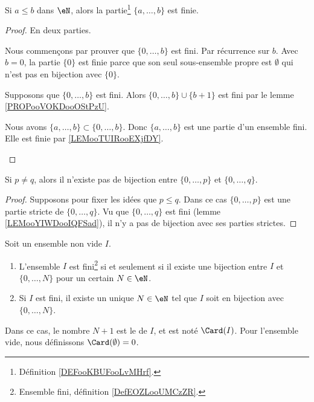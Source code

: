 \begin{lemma}       \label{LEMooYIWDooIQFSad}
	Si \( a\leq b\) dans \( \eN\), alors la partie\footnote{Définition \ref{DEFooKBUFooLvMHrf}.} \( \{ a,\ldots, b \}\) est finie.
\end{lemma}

\begin{proof}
	En deux parties.
	\begin{subproof}
		\spitem[Pour \( a=0\)]
		Nous commençons par prouver que \( \{ 0,\ldots,b \}\) est fini. Par récurrence sur \( b\). Avec \( b=0\), la partie \( \{ 0 \}\) est finie parce que son seul sous-ensemble propre est \( \emptyset\) qui n'est pas en bijection avec \( \{ 0 \}\).

		Supposons que \( \{ 0,\ldots, b \}\) est fini. Alors \( \{ 0,\ldots, b \}\cup \{ b+1 \}\) est fini par le lemme \ref{PROPooVOKDooOStPzU}.

		Nous avons \( \{ a,\ldots,b \}\subset\{ 0,\ldots,b \}\). Donc \( \{ a,\ldots,b \}\) est une partie d'un ensemble fini. Elle est finie par \ref{LEMooTUIRooEXjfDY}.
	\end{subproof}
\end{proof}

\begin{lemma}       \label{LEMooJDGOooHdyJnu}
	Si \( p\neq q\), alors il n'existe pas de bijection entre \( \{ 0,\ldots, p \}\) et \( \{ 0,\ldots, q \}\).
\end{lemma}

\begin{proof}
	Supposons pour fixer les idées que \( p\leq q\). Dans ce cas \( \{ 0,\ldots, p \}\) est une partie stricte de \( \{ 0,\ldots, q \}\). Vu que \( \{ 0,\ldots, q \}\) est fini (lemme \ref{LEMooYIWDooIQFSad}), il n'y a pas de bijection avec ses parties strictes.
\end{proof}

\begin{propositionDef}     \label{PROPooJLGKooDCcnWi}
	Soit un ensemble non vide \( I\).
	\begin{enumerate}
		\item   \label{ITEMooMNMTooEOIjdo}
		      L'ensemble \( I\) est fini\footnote{Ensemble fini, définition \ref{DefEOZLooUMCzZR}.} si et seulement si il existe une bijection entre \( I\) et \( \{ 0,\ldots, N \}\) pour un certain \( N\in \eN\).
		\item   \label{ITEMooZJFUooSNUSIk}
		      Si \( I\) est fini, il existe un unique \( N\in \eN\) tel que \( I\) soit en bijection avec \( \{ 0,\ldots, N \}\).
	\end{enumerate}
	Dans ce cas, le nombre \( N+1\) est le  de \( I\), et est noté \( \Card(I)\). Pour l'ensemble vide, nous définissons \( \Card(\emptyset)=0\).
\end{propositionDef}

